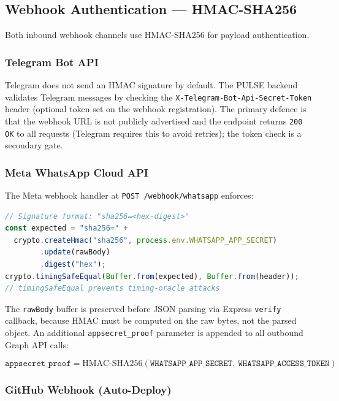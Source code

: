 \documentclass[12pt,a4paper]{article}
\begin{document}
\subsection{Webhook Authentication — HMAC-SHA256}

Both inbound webhook channels use HMAC-SHA256 for payload authentication.

\subsubsection{Telegram Bot API}

Telegram does not send an HMAC signature by default. The PULSE backend validates
Telegram messages by checking the \texttt{X-Telegram-Bot-Api-Secret-Token} header
(optional token set on the webhook registration). The primary defence is that the
webhook URL is not publicly advertised and the endpoint returns \texttt{200 OK}
to all requests (Telegram requires this to avoid retries); the token check is a
secondary gate.

\subsubsection{Meta WhatsApp Cloud API}

The Meta webhook handler at \texttt{POST /webhook/whatsapp} enforces:

\begin{lstlisting}[language=JavaScript]
// Signature format: "sha256=<hex-digest>"
const expected = "sha256=" +
  crypto.createHmac("sha256", process.env.WHATSAPP_APP_SECRET)
        .update(rawBody)
        .digest("hex");
crypto.timingSafeEqual(Buffer.from(expected), Buffer.from(header));
// timingSafeEqual prevents timing-oracle attacks
\end{lstlisting}

The \texttt{rawBody} buffer is preserved before JSON parsing via Express
\texttt{verify} callback, because HMAC must be computed on the raw bytes,
not the parsed object. An additional \texttt{appsecret\_proof} parameter is
appended to all outbound Graph API calls:

\[
\texttt{appsecret\_proof} = \text{HMAC-SHA256}(\texttt{WHATSAPP\_APP\_SECRET},\ \texttt{WHATSAPP\_ACCESS\_TOKEN})
\]

\subsubsection{GitHub Webhook (Auto-Deploy)}
\end{document}
